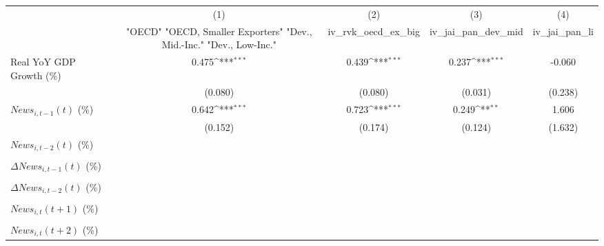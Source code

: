 {
\def\sym#1{\ifmmode^{#1}\else\(^{#1}\)\fi}
\begin{tabular}{l*{4}{c}}
\toprule
                    &\multicolumn{1}{c}{(1)}&\multicolumn{1}{c}{(2)}&\multicolumn{1}{c}{(3)}&\multicolumn{1}{c}{(4)}\\
                    &\multicolumn{1}{c}{ "OECD" "OECD, Smaller Exporters" "Dev., Mid.-Inc." "Dev., Low-Inc."}&\multicolumn{1}{c}{iv_rvk_oecd_ex_big}&\multicolumn{1}{c}{iv_jai_pan_dev_mid}&\multicolumn{1}{c}{iv_jai_pan_li}\\
\midrule
Real YoY GDP Growth (\%)&       0.475\sym{***}&       0.439\sym{***}&       0.237\sym{***}&      -0.060         \\
                    &     (0.080)         &     (0.080)         &     (0.031)         &     (0.238)         \\
\addlinespace
$ News_{i,t-1}(t)$ (\%)&       0.642\sym{***}&       0.723\sym{***}&       0.249\sym{**} &       1.606         \\
                    &     (0.152)         &     (0.174)         &     (0.124)         &     (1.632)         \\
\addlinespace
$ News_{i,t-2}(t)$ (\%)&                     &                     &                     &                     \\
                    &                     &                     &                     &                     \\
\addlinespace
$ \Delta News_{i,t-1}(t)$ (\%)&                     &                     &                     &                     \\
                    &                     &                     &                     &                     \\
\addlinespace
$ \Delta News_{i,t-2}(t)$ (\%)&                     &                     &                     &                     \\
                    &                     &                     &                     &                     \\
\addlinespace
$ News_{i,t}(t+1)$ (\%)&                     &                     &                     &                     \\
                    &                     &                     &                     &                     \\
\addlinespace
$ News_{i,t}(t+2)$ (\%)&                     &                     &                     &                     \\

\end{tabular}}
